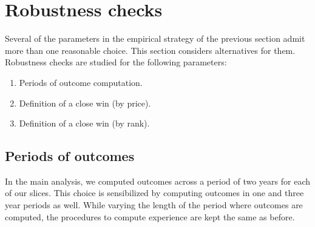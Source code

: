 


%


\section{Robustness checks}
\label{main_robustness}
Several of the parameters in the empirical strategy of the previous section admit more than one reasonable choice. This section considers alternatives for them. Robustness checks are studied for the following parameters:
\begin{enumerate}
  \item Periods of outcome computation.
  \item Definition of a close win (by price).
  \item Definition of a close win (by rank).
\end{enumerate}
\subsection{Periods of outcomes}
In the main analysis, we computed outcomes across a period of two years for each of our slices. This choice is sensibilized by computing outcomes in one and three year periods as well. While varying the length of the period where outcomes are computed, the procedures to compute experience are kept the same as before.

